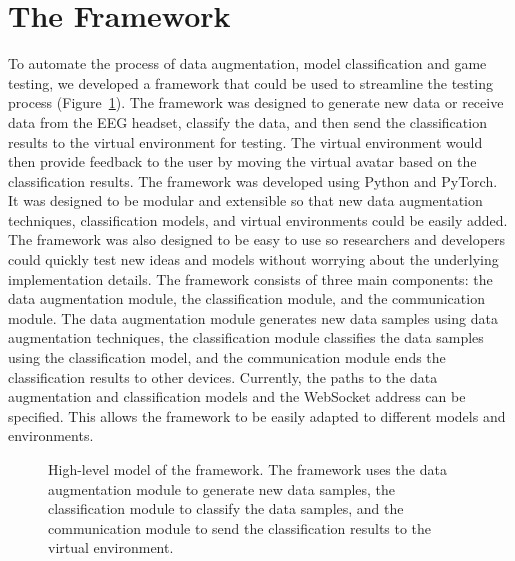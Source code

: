 \section{The Framework}
To automate the process of data augmentation, model classification and game testing, we developed a framework that could be used to streamline the testing process (Figure~\ref{fig:framework}).
The framework was designed to generate new data or receive data from the EEG headset, classify the data, and then send the classification results to the virtual environment for testing.
The virtual environment would then provide feedback to the user by moving the virtual avatar based on the classification results.
The framework was developed using Python and PyTorch. It was designed to be modular and extensible so that new data augmentation techniques, classification models, and virtual environments could be easily added.
The framework was also designed to be easy to use so researchers and developers could quickly test new ideas and models without worrying about the underlying implementation details.
The framework consists of three main components: the data augmentation module, the classification module, and the communication module.
The data augmentation module generates new data samples using data augmentation techniques, the classification module classifies the data samples using the classification model, and the communication module ends the classification results to other devices.
Currently, the paths to the data augmentation and classification models and the WebSocket address can be specified. This allows the framework to be easily adapted to different models and environments.

\begin{figure}[!htbp]
    \centering
\caption{High-level model of the framework.
The framework uses the data augmentation module to generate new data samples, the classification module to classify the data samples, and the communication module to send the classification results to the virtual environment.}
\label{fig:framework}
\end{figure}

